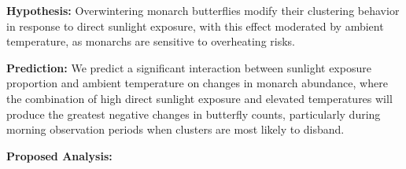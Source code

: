 \textbf{Hypothesis:} Overwintering monarch butterflies modify their clustering behavior in response to direct sunlight exposure, with this effect moderated by ambient temperature, as monarchs are sensitive to overheating risks.

\textbf{Prediction:} We predict a significant interaction between sunlight exposure proportion and ambient temperature on changes in monarch abundance, where the combination of high direct sunlight exposure and elevated temperatures will produce the greatest negative changes in butterfly counts, particularly during morning observation periods when clusters are most likely to disband.

\textbf{Proposed Analysis:}
